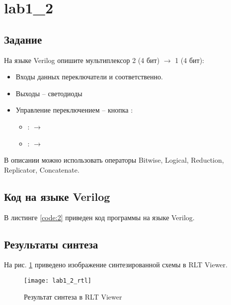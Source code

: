 \newpage

\section{lab1\_2}

\subsection{Задание}

На языке Verilog опишите мультиплексор 2 (4 бит) $\rightarrow$ 1 (4 бит):
\begin{itemize}
	\item Входы данных переключатели  и  соответственно.
	\item Выходы – светодиоды 
	\item Управление переключением – кнопка :
		\begin{itemize}
			\item {}:  $\rightarrow$ 
			\item {}:  $\rightarrow$ 
		\end{itemize}
\end{itemize}

В описании можно использовать операторы Bitwise, Logical, Reduction, Replicator, Concatenate.

\subsection{Код на языке Verilog}

В листинге \ref{code:2} приведен код программы на языке Verilog.



\newpage

\subsection{Результаты синтеза}

На рис. \ref{fig:lab1_2_rtl} приведено изображение синтезированной схемы в RLT Viewer.

\begin{figure}[H]
\begin{center}
	\texttt{[image: lab1\_2\_rtl]}
	\caption{Результат синтеза в RLT Viewer}
	\label{fig:lab1_2_rtl}
\end{center}
\end{figure}

